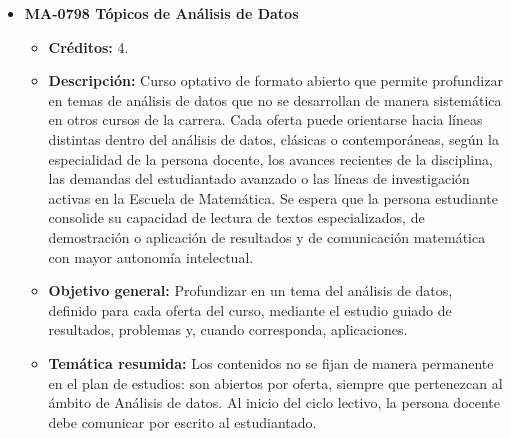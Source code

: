\begin{itemize}[leftmargin=1.3em, itemsep=10pt, topsep=4pt, label={\color{Azul-UCR}$\blacksquare$}]
\item {\color{Azul-UCR}\textbf{MA-0798 Tópicos de Análisis de Datos}}\par\nopagebreak\smallskip
\begin{itemize}[leftmargin=1.1em, itemsep=3pt, topsep=2pt, parsep=2pt, label={\textendash}]
\item \textbf{Créditos:} 4.
\item \textbf{Descripción:} Curso optativo de formato abierto que permite profundizar en temas de análisis de datos que no se desarrollan de manera sistemática en otros cursos de la carrera. Cada oferta puede orientarse hacia líneas distintas dentro del análisis de datos, clásicas o contemporáneas, según la especialidad de la persona docente, los avances recientes de la disciplina, las demandas del estudiantado avanzado o las líneas de investigación activas en la Escuela de Matemática. Se espera que la persona estudiante consolide su capacidad de lectura de textos especializados, de demostración o aplicación de resultados y de comunicación matemática con mayor autonomía intelectual.
\item \textbf{Objetivo general:} Profundizar en un tema del análisis de datos, definido para cada oferta del curso, mediante el estudio guiado de resultados, problemas y, cuando corresponda, aplicaciones.
\item \textbf{Temática resumida:} Los contenidos no se fijan de manera permanente en el plan de estudios: son abiertos por oferta, siempre que pertenezcan al ámbito de Análisis de datos. Al inicio del ciclo lectivo, la persona docente debe comunicar por escrito al estudiantado.
\end{itemize}


\end{itemize}
